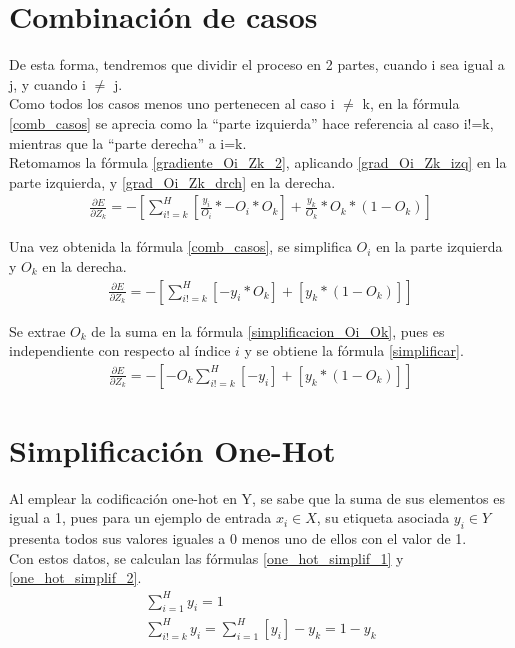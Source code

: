 \section{Combinación de casos}

De esta forma, tendremos que dividir  el proceso en 2 partes, cuando i sea igual a j, y cuando i $\neq$ j. \\
Como todos los casos menos uno pertenecen al caso i $\neq$ k, en la fórmula \ref{comb_casos} se aprecia como la ``parte izquierda'' hace referencia al caso i!=k, mientras que la ``parte derecha'' a i=k. \\
Retomamos la fórmula \ref{gradiente_Oi_Zk_2}, aplicando \ref{grad_Oi_Zk_izq} en la parte izquierda, y \ref{grad_Oi_Zk_drch} en la derecha. \\
\begin{gather}
	\frac{\partial E}{\partial Z_k} = - [\sum_{i!=k}^{H} [\frac{y_i}{O_i} * -O_i * O_k ] + \frac{y_k}{O_k} * O_k * (1 - O_k)  ]
	\label{comb_casos}
\end{gather}

Una vez obtenida la fórmula \ref{comb_casos}, se simplifica $O_i$ en la parte izquierda y $O_k$ en la derecha. \\
\begin{gather}
	\frac{\partial E}{\partial Z_k} = - [\sum_{i!=k}^{H} [- y_i * O_k] + [y_k * (1 - O_k) ] ] 
	\label{simplificacion_Oi_Ok}
\end{gather}

Se extrae $O_k$ de la suma en la fórmula \ref{simplificacion_Oi_Ok}, pues es independiente con respecto al índice $i$ y se obtiene la fórmula \ref{simplificar}.\\
\begin{gather}	
	\frac{\partial E}{\partial Z_k} = - [-O_k \sum_{i!=k}^{H}[-y_i] + [y_k * (1 - O_k) ] ]
	\label{simplificar}
\end{gather}

\section{Simplificación One-Hot}

Al emplear la codificación one-hot en Y, se sabe que la suma de sus elementos es igual a 1, pues para un ejemplo de entrada $x_i \in X$, su etiqueta asociada $y_i \in Y$ presenta todos sus valores iguales a 0 menos uno de ellos con el valor de 1. \\
Con estos datos, se calculan las fórmulas \ref{one_hot_simplif_1} y \ref{one_hot_simplif_2}.
\begin{gather}
	\sum_{i=1}^{H} y_i = 1 \label{one_hot_simplif_1}\\
	\sum_{i!=k}^{H} y_i = \sum_{i=1}^{H} [y_i] - y_k = 1 - y_k
	\label{one_hot_simplif_2}
\end{gather}

